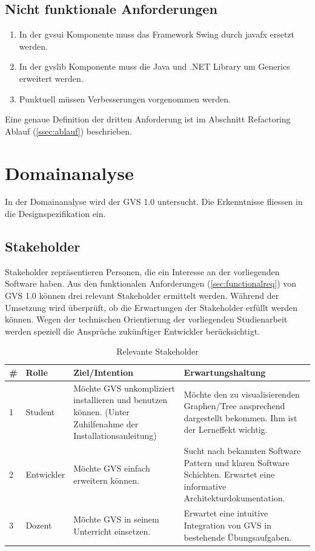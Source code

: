 \documentclass[11pt,a4paper,english,oneside]{book}
\numberwithin{equation}{chapter}
\begin{document}
	\subsection{Nicht funktionale Anforderungen}
	
	\begin{enumerate}
		\item In der \gls{gvsui} Komponente muss das Framework Swing durch \gls{javafx} ersetzt werden.
		\item In der \gls{gvslib} Komponente muss die Java und .NET Library um Generics erweitert werden. 
		\item Punktuell müssen Verbesserungen vorgenommen werden.
	\end{enumerate}

	\noindent
	Eine genaue Definition der dritten Anforderung ist im Abschnitt Refactoring Ablauf (\ref{ssec:ablauf}) beschrieben.
	
	\section{Domainanalyse}
	In der Domainanalyse wird der GVS 1.0 untersucht. Die Erkenntnisse fliessen in die Designspezifikation ein.
		
	\subsection{Stakeholder} \label{ssec:stakeholder}
	Stakeholder repräsentieren Personen, die ein Interesse an der vorliegenden Software haben. Aus den funktionalen Anforderungen (\ref{sec:functionalreq}) von GVS 1.0 können drei relevant Stakeholder ermittelt werden. Während der Umsetzung wird überprüft, ob die Erwartungen der Stakeholder erfüllt werden können. Wegen der technischen Orientierung der vorliegenden Studienarbeit werden speziell die Ansprüche zukünftiger Entwickler berücksichtigt.
	
	\begin{table}[h!]
		\centering
		\begin{tabularx}{\linewidth}{l l X X}
			\toprule 
			\# & Rolle & Ziel/Intention & Erwartungshaltung \\
			\midrule
			1 & Student & Möchte GVS unkompliziert installieren und benutzen können. (Unter Zuhilfenahme der Installationsanleitung) & Möchte den zu visualisierenden Graphen/Tree ansprechend dargestellt bekommen. Ihm ist der Lerneffekt wichtig.  \\
			2 & Entwickler & Möchte GVS einfach erweitern können. & Sucht nach bekannten Software Pattern und klaren Software Schichten. Erwartet eine informative Architekturdokumentation. \\			
			3 & Dozent & Möchte GVS in seinem Unterricht einsetzen. & Erwartet eine intuitive Integration von GVS in bestehende Übungsaufgaben. \\
			\bottomrule 
		\end{tabularx} 
		\caption{Relevante Stakeholder} 
	\end{table}
\end{document}
